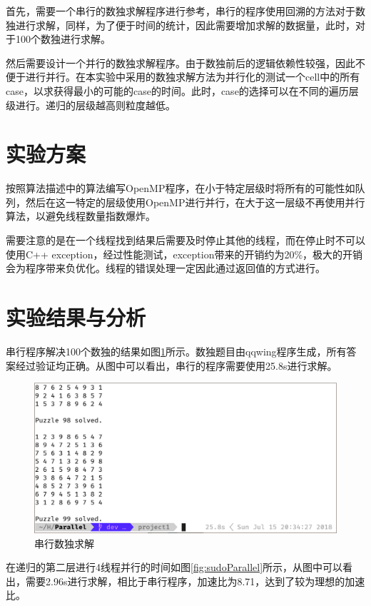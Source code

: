 \documentclass{report}
\begin{document}
\par 首先，需要一个串行的数独求解程序进行参考，串行的程序使用回溯的方法对于数独进行求解，同样，为了便于时间的统计，因此需要增加求解的数据量，此时，对于100个数独进行求解。
\par 然后需要设计一个并行的数独求解程序。由于数独前后的逻辑依赖性较强，因此不便于进行并行。在本实验中采用的数独求解方法为并行化的测试一个cell中的所有case，以求获得最小的可能的case的时间。此时，case的选择可以在不同的遍历层级进行。递归的层级越高则粒度越低。

\section{实验方案}
\par 按照算法描述中的算法编写OpenMP程序，在小于特定层级时将所有的可能性如队列，然后在这一特定的层级使用OpenMP进行并行，在大于这一层级不再使用并行算法，以避免线程数量指数爆炸。
\par 需要注意的是在一个线程找到结果后需要及时停止其他的线程，而在停止时不可以使用C++ exception，经过性能测试，exception带来的开销约为20\%，极大的开销会为程序带来负优化。线程的错误处理一定因此通过返回值的方式进行。

\section{实验结果与分析}
\par 串行程序解决100个数独的结果如图\ref{fig:sudoSerial}所示。数独题目由qqwing程序生成，所有答案经过验证均正确。从图中可以看出，串行的程序需要使用25.8s进行求解。
\begin{figure}[htpb]
    \centering
    \includegraphics[width=0.9\linewidth]{sudoSerial.png}
    \caption{串行数独求解}
    \label{fig:sudoSerial}
\end{figure}
\par 在递归的第二层进行4线程并行的时间如图\ref{fig:sudoParallel}所示，从图中可以看出，需要2.96s进行求解，相比于串行程序，加速比为8.71，达到了较为理想的加速比。
\end{document}
